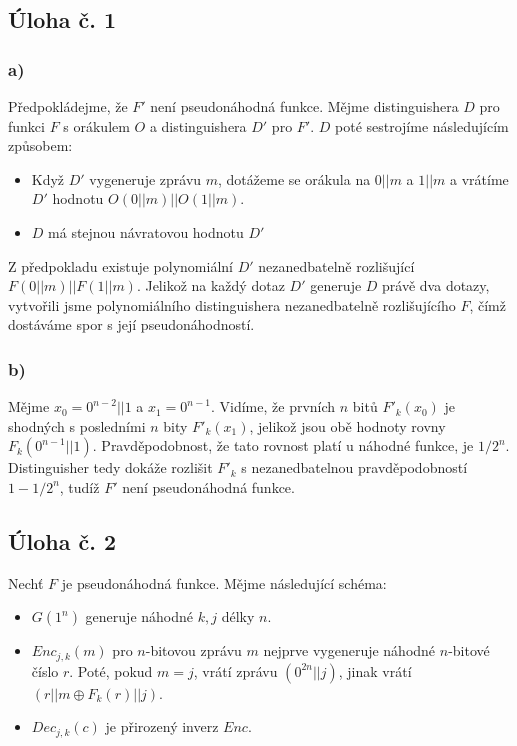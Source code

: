 \documentclass{scrartcl}
\begin{document}
    \subsection*{Úloha č. 1}
    \subsubsection*{a)}
    Předpokládejme, že $F'$ není pseudonáhodná funkce. Mějme distinguishera $D$ pro funkci $F$ s orákulem $O$ a distinguishera $D'$ pro $F'$. $D$ poté sestrojíme následujícím způsobem:
    \begin{itemize}
        \item Když $D'$ vygeneruje zprávu $m$, dotážeme se orákula na $0||m$ a $1||m$ a vrátíme $D'$ hodnotu $O(0||m)||O(1||m)$.
        \item $D$ má stejnou návratovou hodnotu $D'$
    \end{itemize}
    Z předpokladu existuje polynomiální $D'$ nezanedbatelně rozlišující $F(0||m)||F(1||m)$. Jelikož na každý dotaz $D'$ generuje $D$ právě dva dotazy, vytvořili jsme polynomiálního distinguishera nezanedbatelně rozlišujícího $F$, čímž dostáváme spor s její pseudonáhodností.
    \subsubsection*{b)}
    Mějme $x_0 = 0^{n-2}||1$ a $x_1 = 0^{n-1}$. Vidíme, že prvních $n$ bitů $F'_k(x_0)$ je shodných s posledními $n$ bity $F'_k(x_1)$, jelikož jsou obě hodnoty rovny $F_k(0^{n-1}||1)$. Pravděpodobnost, že tato rovnost platí u náhodné funkce, je $1/2^n$. Distinguisher tedy dokáže rozlišit $F'_k$ s nezanedbatelnou pravděpodobností $1 - 1/2^n$, tudíž $F'$ není pseudonáhodná funkce.

    \subsection*{Úloha č. 2}
    Nechť $F$ je pseudonáhodná funkce. Mějme následující schéma:
    \begin{itemize}
        \item $G(1^n)$ generuje náhodné $k,j$ délky $n$.
        \item $Enc_{j,k}(m)$ pro $n$-bitovou zprávu $m$ nejprve vygeneruje náhodné $n$-bitové číslo $r$. Poté, pokud $m = j$, vrátí zprávu $(0^{2n}||j)$, jinak vrátí $(r||m \oplus F_k(r)||j)$.
        \item $Dec_{j,k}(c)$ je přirozený inverz $Enc$.
    \end{itemize}
\end{document}
